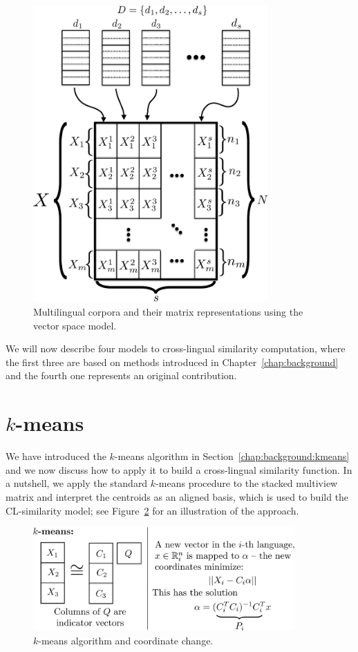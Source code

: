 \begin{figure}[tbp]
\centering
\includegraphics[width=9cm]{figures/stacked_matrices1-crop.pdf}
\caption[Multilingual corpus matrices]{Multilingual corpora and their matrix representations using the vector space model.}
\label{fig:stacked_matrices}
\end{figure}

We will now describe four models to cross-lingual similarity computation, where the first three are based on
methods introduced in Chapter~\ref{chap:background} and the fourth one represents an original contribution.
\section{$k$-means}\label{chap:crosslingual:kmeans}

We have introduced the $k$-means algorithm in Section~\ref{chap:background:kmeans} and we now discuss
how to apply it to build a cross-lingual similarity function. In a nutshell, we apply the standard
$k$-means procedure to the stacked multiview matrix and interpret the centroids as an aligned basis, which
is used to build the CL-similarity model; see Figure~\ref{fig:kmeans} for an illustration of the approach.

\begin{figure}[tbp]
\centering
\includegraphics[width=10cm]{figures/kmeans.pdf}
\caption{$k$-means algorithm and coordinate change.}
\label{fig:kmeans}
\end{figure}

